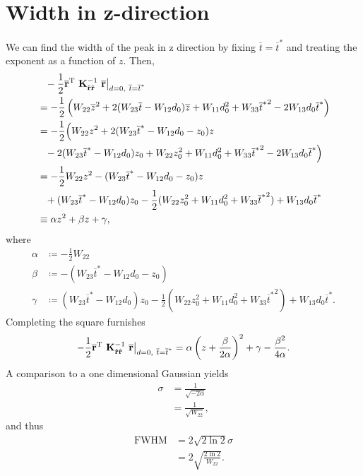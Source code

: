 \documentclass[12pt,a4paper]{scrarticle}
\begin{document}
\section{Width in z-direction}
We can find the width of the peak in z direction by fixing $\overline{t} = \overline{t}^*$ and treating the exponent as a function of $z$. Then,
\begin{align*}
\label{eq:target}
    &\hphantom{=} -\frac{1}{2} \ipCoordShifted^{\transpose} \ \CovMat{\ip}^{-1} \ \ipCoordShifted \big|_{d = 0,\ \overline{t} = \overline{t}^*} \\
    &= -\frac{1}{2} \left(W_{22} \overline{z}^2  + 2 (W_{23} \overline{t} - W_{12} d_0) \overline{z} + W_{11} d_0^2 + W_{33} {\overline{t}^*}^2 - 2 W_{13} d_0 \overline{t}^* \right) \\
    &= -\frac{1}{2} \Big(W_{22} z^2  + 2 (W_{23} \overline{t}^* - W_{12} d_0 - z_0) z \\ 
    &\hphantom{=} - 2 (W_{23} \overline{t}^* - W_{12} d_0) z_0 + W_{22} z_0^2 + W_{11} d_0^2 + W_{33} {\overline{t}^*}^2 - 2 W_{13} d_0 \overline{t}^* \Big) \\
    &= -\frac{1}{2} W_{22} z^2 - (W_{23} \overline{t}^* - W_{12} d_0 - z_0) z \\ 
    &\hphantom{=} + (W_{23} \overline{t}^* - W_{12} d_0) z_0 -\frac{1}{2} (W_{22} z_0^2 + W_{11} d_0^2 + W_{33} {\overline{t}^*}^2) + W_{13} d_0 \overline{t}^* \\
    &\equiv \alpha  z^2 + \beta z + \gamma,
\end{align*}
where \begin{align*}
    \alpha &\coloneqq -\frac{1}{2} W_{22} \\
    \beta &\coloneqq - (W_{23} \overline{t}^* - W_{12} d_0 - z_0) \\
    \gamma &\coloneqq (W_{23} \overline{t}^* - W_{12} d_0) z_0 -\frac{1}{2} (W_{22} z_0^2 + W_{11} d_0^2 + W_{33} {\overline{t}^*}^2) + W_{13} d_0 \overline{t}^*.
\end{align*}
%
Completing the square furnishes 
\begin{align*}
    -\frac{1}{2} \ipCoordShifted^{\transpose} \ \CovMat{\ip}^{-1} \ \ipCoordShifted \big|_{d = 0,\ \overline{t} = \overline{t}^*} = \alpha \left( z + \frac{\beta}{2 \alpha}\right)^2 + \gamma -\frac{\beta^2}{4 \alpha}.
\end{align*}
%
A comparison to a one dimensional Gaussian yields
\begin{align*}
    \sigma 
    &= \frac{1}{\sqrt{- 2 \alpha}} \\
    &= \frac{1}{\sqrt{W_{22}}},
\end{align*}
and thus \cite{fwhm}
\begin{align*}
    \text{FWHM}
    &= 2 \sqrt{2 \ln{2}} \sigma \\
    &=  2 \sqrt{\frac{2 \ln{2}}{W_{22}}}. 
\end{align*}

\printbibliography{}
\end{document}
